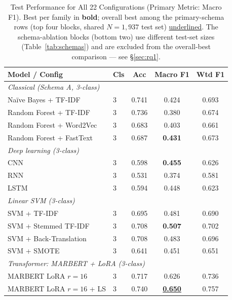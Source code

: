 \documentclass[conference]{IEEEtran}
\begin{document}
\begin{table}[t]
  \centering
  \caption{Test Performance for All 22 Configurations (Primary Metric: Macro F1).
           Best per family in \textbf{bold}; overall best among the primary-schema
           rows (top four blocks, shared $N{=}1{,}937$ test set) \underline{underlined}.
           The schema-ablation blocks (bottom two) use different test-set sizes
           (Table~\ref{tab:schemas}) and are excluded from the overall-best comparison
           --- see \S\ref{sec:rq1}.}
  \label{tab:perf}
  \setlength{\tabcolsep}{3.5pt}
  \begin{tabular}{llccc}
    \toprule
    \textbf{Model / Config} & \textbf{Cls} & \textbf{Acc} & \textbf{Macro F1} & \textbf{Wtd F1} \\
    \midrule
    \multicolumn{5}{l}{\textit{Classical (Schema A, 3-class)}}\\
    Na\"{i}ve Bayes + TF-IDF    & 3 & 0.741 & 0.424 & 0.693 \\
    Random Forest + TF-IDF      & 3 & 0.736 & 0.380 & 0.674 \\
    Random Forest + Word2Vec    & 3 & 0.683 & 0.403 & 0.661 \\
    Random Forest + FastText    & 3 & 0.687 & \textbf{0.431} & 0.673 \\
    \midrule
    \multicolumn{5}{l}{\textit{Deep learning (3-class)}}\\
    CNN                         & 3 & 0.598 & \textbf{0.455} & 0.626 \\
    RNN                         & 3 & 0.531 & 0.374 & 0.581 \\
    LSTM                        & 3 & 0.594 & 0.448 & 0.623 \\
    \midrule
    \multicolumn{5}{l}{\textit{Linear SVM (3-class)}}\\
    SVM + TF-IDF                & 3 & 0.695 & 0.481 & 0.690 \\
    SVM + Stemmed TF-IDF        & 3 & 0.708 & \textbf{0.507} & 0.702 \\
    SVM + Back-Translation      & 3 & 0.708 & 0.483 & 0.696 \\
    SVM + SMOTE                 & 3 & 0.641 & 0.451 & 0.651 \\
    \midrule
    \multicolumn{5}{l}{\textit{Transformer: MARBERT + LoRA (3-class)}}\\
    MARBERT LoRA $r{=}16$       & 3 & 0.717 & 0.626 & 0.736 \\
    MARBERT LoRA $r{=}16$ + LS  & 3 & 0.740 & \underline{\textbf{0.650}} & 0.757 \\

\end{tabular}
\end{table}
\end{document}
